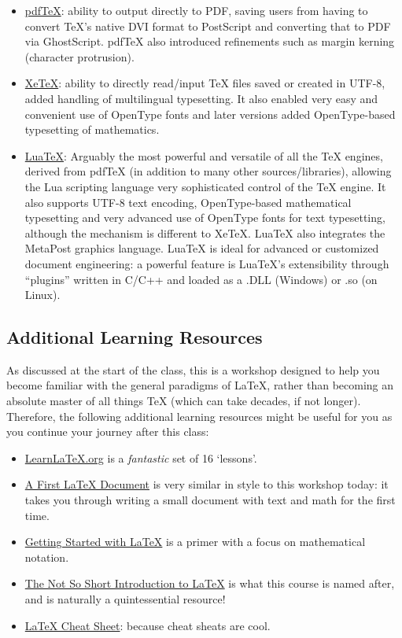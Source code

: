 \documentclass[a4paper, 12pt]{article}
\begin{document}
\begin{itemize}
\item \href{www.tug.org/applications/pdftex}{pdfTeX}: ability to output directly to PDF, saving users from having to convert TeX’s native DVI format to PostScript and converting that to PDF via GhostScript. pdfTeX also introduced refinements such as margin kerning (character protrusion).
\item \href{http://tug.org/xetex}{XeTeX}: ability to directly read/input TeX files saved or created in UTF-8, added handling of multilingual typesetting. It also enabled very easy and convenient use of OpenType fonts and later versions added OpenType-based typesetting of mathematics.
\item \href{www.luatex.org}{LuaTeX}: Arguably the most powerful and versatile of all the TeX engines, derived from pdfTeX (in addition to many other sources/libraries), allowing the Lua scripting language very sophisticated control of the TeX engine. It also supports UTF-8 text encoding, OpenType-based mathematical typesetting and very advanced use of OpenType fonts for text typesetting, although the mechanism is different to XeTeX. LuaTeX also integrates the MetaPost graphics language. LuaTeX is ideal for advanced or customized document engineering: a powerful feature is LuaTeX’s extensibility through “plugins” written in C/C++ and loaded as a .DLL (Windows) or .so (on Linux).
\end{itemize}

\subsection{Additional Learning Resources}

As discussed at the start of the class, this is a workshop designed to help you become familiar with the general paradigms of \LaTeX{}, rather than becoming an absolute master of all things \TeX{} (which can take decades, if not longer). Therefore, the following additional learning resources might be useful for you as you continue your journey after this class:

\begin{itemize}
\item \href{https://www.learnlatex.org/en/}{\color{red}LearnLaTeX.org} is a \emph{fantastic} set of 16 `lessons'.
\item \href{https://ctan.org/pkg/first-latex-doc}{\color{red}A First LaTeX Document} is very similar in style to this workshop today: it takes you through writing a small document with text and math for the first time. 
\item \href{https://www.maths.tcd.ie/~dwilkins/LaTeXPrimer/}{\color{red}Getting Started with LaTeX} is a primer with a focus on mathematical notation.
\item \href{https://tobi.oetiker.ch/lshort/lshort.pdf}{\color{red}The Not So Short Introduction to \LaTeX{}} is what this course is named after, and is naturally a quintessential resource!
\item \href{http://www.stdout.org/~winston/latex/}{\color{red}LaTeX Cheat Sheet}: because cheat sheats are cool.
\end{itemize}
\end{document}
